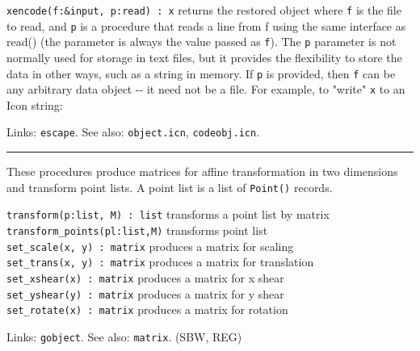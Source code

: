 \texttt{xencode(f:\&input, p:read) : x} returns the restored object
where \texttt{f} is the file to read, and \texttt{p} is a procedure
that reads a line from f using the same interface as read() (the
parameter is always the value passed as \texttt{f}). The \texttt{p}
parameter is not normally used for storage in text files, but it
provides the flexibility to store the data in other ways, such as a
string in memory. If \texttt{p} is provided, then \texttt{f} can be any
arbitrary data object -{}- it need not be a file. For example, to
"write" \texttt{x} to an Icon string:


Links: \texttt{escape}. See also: \texttt{object.icn},
\texttt{codeobj.icn}.

\vspace{0.25cm}\hrule{}

These procedures produce matrices for affine transformation in two
dimensions and transform point lists. A point list is a list of
\texttt{Point()} records.

\texttt{transform(p:list, M) : list} transforms a point list by
matrix\\
\texttt{transform\_points(pl:list,M)} transforms point list\\
\texttt{set\_scale(x, y) : matrix} produces a matrix for scaling\\
\texttt{set\_trans(x, y) : matrix} produces a matrix for
translation\\
\texttt{set\_xshear(x) : matrix} produces a matrix for x shear\\
\texttt{set\_yshear(y) : matrix} produces a matrix for y shear\\
\texttt{set\_rotate(x) : matrix} produces a matrix for rotation

Links: \texttt{gobject}. See also: \texttt{matrix}. (SBW, REG)

